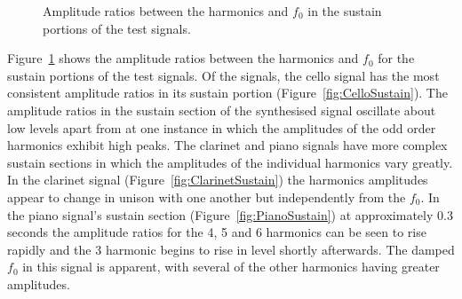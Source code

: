 \begin{figure}[h!]
			\quad
			\caption{Amplitude ratios between the harmonics and $f_{0}$ in the sustain
				 portions of the test signals.}
			\label{fig:SustainAmplitudes}
		\end{figure}

		Figure~\ref{fig:SustainAmplitudes} shows the amplitude ratios between the harmonics and $f_{0}$ for the
		sustain portions of the test signals. Of the signals, the cello signal has the most consistent amplitude
		ratios in its sustain portion (Figure~\ref{fig:CelloSustain}). The amplitude ratios in the sustain section
		of the synthesised signal oscillate about low levels apart from at one instance in which the amplitudes of
		the odd order harmonics exhibit high peaks. The clarinet and piano signals have more complex sustain
		sections in which the amplitudes of the individual harmonics vary greatly. In the clarinet signal
		(Figure~\ref{fig:ClarinetSustain}) the harmonics amplitudes appear to change in unison with one another but
		independently from the $f_{0}$. In the piano signal's sustain section (Figure~\ref{fig:PianoSustain}) at
		approximately 0.3 seconds the amplitude ratios for the 4, 5 and 6 harmonics
		can be seen to rise rapidly and the 3 harmonic begins to rise in level shortly afterwards. The
		damped $f_{0}$ in this signal is apparent, with several of the other harmonics having greater amplitudes.

